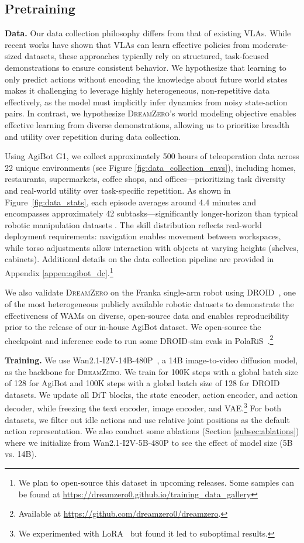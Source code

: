 \documentclass[10pt,logo,copyright]{nvidiatechreport}
\newcommand{\ourmethod}{\mbox{\textsc{DreamZero}}\xspace}
\begin{document}
\subsection{Pretraining}
\textbf{Data.} Our data collection philosophy differs from that of existing VLAs. While recent works have shown that VLAs can learn effective policies from moderate-sized datasets, these approaches typically rely on structured, task-focused demonstrations to ensure consistent behavior. We hypothesize that learning to only predict actions without encoding the knowledge about future world states makes it challenging to leverage highly heterogeneous, non-repetitive data effectively, as the model must implicitly infer dynamics from noisy state-action pairs. In contrast, we hypothesize \ourmethod's world modeling objective enables effective learning from diverse demonstrations, allowing us to prioritize breadth and utility over repetition during data collection.

Using AgiBot G1, we collect approximately 500 hours of teleoperation data across 22 unique environments (see Figure \ref{fig:data_collection_envs}), including homes, restaurants, supermarkets, coffee shops, and offices—prioritizing task diversity and real-world utility over task-specific repetition. As shown in Figure~\ref{fig:data_stats}, each episode averages around 4.4 minutes and encompasses approximately 42 subtasks—significantly longer-horizon than typical robotic manipulation datasets \citep{khazatsky2024droid, walke2023bridgedata}. The skill distribution reflects real-world deployment requirements: navigation enables movement between workspaces, while torso adjustments allow interaction with objects at varying heights (shelves, cabinets). Additional details on the data collection pipeline are provided in Appendix \ref{appen:agibot_dc}.\footnote{We plan to open-source this dataset in upcoming releases. Some samples can be found at \url{https://dreamzero0.github.io/training_data_gallery}}

We also validate \ourmethod on the Franka single-arm robot using DROID~\citep{khazatsky2024droid}, one of the most heterogeneous publicly available robotic datasets to demonstrate the effectiveness of WAMs on diverse, open-source data and enables reproducibility prior to the release of our in-house AgiBot dataset. We open-source the checkpoint and inference code to run some DROID-sim evals in PolaRiS~\citep{jain2025polaris}.\footnote{Available at \url{https://github.com/dreamzero0/dreamzero}.}

\textbf{Training.} We use Wan2.1-I2V-14B-480P~\citep{wan2025wan}, a 14B image-to-video diffusion model, as the backbone for \ourmethod. We train for 100K steps with a global batch size of 128 for AgiBot and 100K steps with a global batch size of 128 for DROID datasets. We update all DiT blocks, the state encoder, action encoder, and action decoder, while freezing the text encoder, image encoder, and VAE.\footnote{We experimented with LoRA~\citep{hu2022lora} but found it led to suboptimal results.} For both datasets, we filter out idle actions and use relative joint positions as the default action representation. We also conduct some ablations (Section \ref{subsec:ablations}) where we initialize from Wan2.1-I2V-5B-480P to see the effect of model size (5B vs. 14B).
\end{document}

